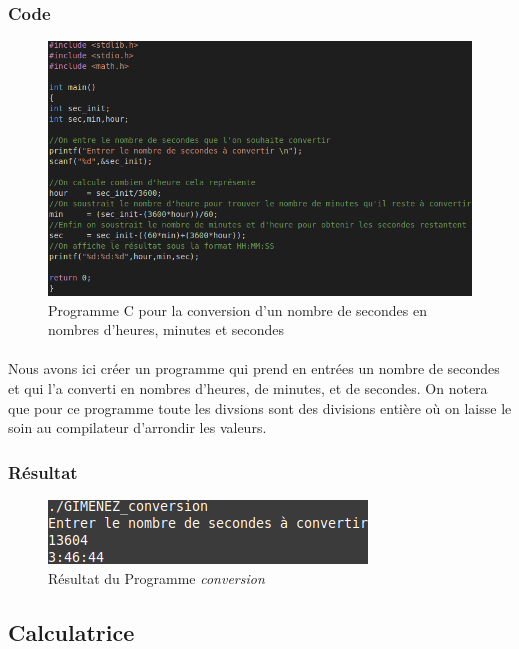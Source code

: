 \documentclass[10pt,a4paper]{article}
\begin{document}
\subsubsection{Code}
	\begin{figure}[h]
	\begin{center}
	\includegraphics[scale=.3]{images/conversion_c}
	\end{center}
	\caption{Programme C pour la conversion d'un nombre de secondes en nombres d'heures, minutes et secondes}
	\end{figure}
\paragraph{}
	Nous avons ici créer un programme qui prend en entrées un nombre de secondes et qui l'a converti 
	en nombres d'heures, de minutes, et de secondes. On notera que pour ce programme toute les 
	divsions sont des divisions entière où on laisse le soin au compilateur d'arrondir les valeurs.
\subsubsection{Résultat}
	\begin{figure}[h]
	\begin{center}
	\includegraphics[scale=.3]{images/conversion_ex}
	\end{center}
	\caption{Résultat du Programme \emph{conversion}}
	\end{figure}

\subsection{Calculatrice}
\end{document}
